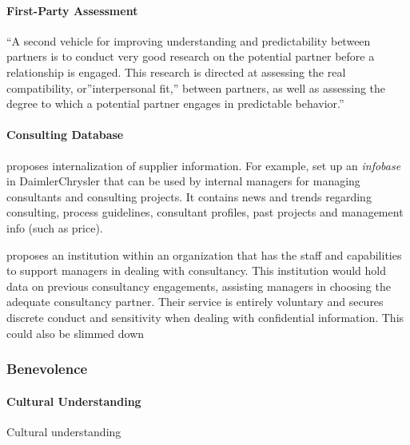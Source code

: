 \documentclass[12pt]{article}
\begin{document}
\hypertarget{first-party-assessment-1}{%
\paragraph{First-Party Assessment}\label{first-party-assessment-1}}

``A second vehicle for improving understanding and predictability
between partners is to conduct very good research on the potential
partner before a relationship is engaged. This research is directed at
assessing the real compatibility, or''interpersonal fit,'' between
partners, as well as assessing the degree to which a potential partner
engages in predictable behavior.'' \citep[ 370]{shapiro1992}

\hypertarget{consulting-database}{%
\paragraph{Consulting Database}\label{consulting-database}}

\citet[5]{sturdy2021} proposes internalization of supplier information.
For example, \citet{mohe2006} set up an \emph{infobase} in
DaimlerChrysler that can be used by internal managers for managing
consultants and consulting projects. It contains news and trends
regarding consulting, process guidelines, consultant profiles, past
projects and management info (such as price).

\citet[308]{honer2006} proposes an institution within an organization
that has the staff and capabilities to support managers in dealing with
consultancy. This institution would hold data on previous consultancy
engagements, assisting managers in choosing the adequate consultancy
partner. Their service is entirely voluntary and secures discrete
conduct and sensitivity when dealing with confidential information. This
could also be slimmed down

\hypertarget{benevolence}{%
\subsubsection{Benevolence}\label{benevolence}}

\hypertarget{cultural-understanding}{%
\paragraph{Cultural Understanding}\label{cultural-understanding}}

Cultural understanding
\end{document}
